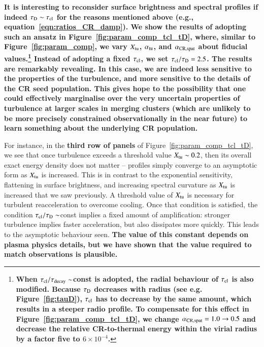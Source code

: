 \documentclass[fleqn,usenatbib,useAMS]{mnras}
\newcommand\C[1]{{\bf #1}}
\begin{document}
\C{It is
  interesting to reconsider surface brightness and spectral profiles if indeed
  $\tau_{\rm D} \sim \tau_{\rm cl}$ for the reasons mentioned above (e.g.,
  equation~\ref{eqn:ratios_CR_damp}). We show the results of adopting such an
  ansatz in Figure~\ref{fig:param_comp_tcl_tD}, where, similar to
  Figure~\ref{fig:param_comp}, we vary $X_{\rm tu}$, $\alpha_{\rm tu}$, and
  $\alpha_{\rm CR, spat}$ about fiducial values.\footnote{\C{When \C{$\tau_{\rm cl}/\tau_{\rm decay} \sim$const} is adopted, the radial behaviour of $\tau_{\rm cl}$ is
      also modified. Because $\tau_{\rm D}$ decreases with radius (see
      e.g. Figure~\ref{fig:tauD}), $\tau_{\rm cl}$ has to decrease by the same
      amount, which results in a steeper radio profile. To compensate for this
      effect in Figure~\ref{fig:param_comp_tcl_tD}, we change $\alpha_{\rm CR,
        spat}=1.0\rightarrow0.5$ and decrease the relative CR-to-thermal energy
      within the virial radius by a factor five to $6\times10^{-4}$.}} Instead
  of adopting a fixed $\tau_{\rm cl}$, we set $\tau_{\rm
    cl}/\tau_{\rm D} = 2.5 $. The results are remarkably revealing. In this case, we are indeed less
  sensitive to the properties of the turbulence, and more sensitive to the
  details of the CR seed population.  This gives hope to the possibility that
  one could effectively marginalise over the very uncertain properties of
  turbulence at larger scales in merging clusters (which are unlikely to be more
  precisely constrained observationally in the near future) to learn something
  about the underlying CR population.}

For instance, in the \C{third row of panels} of
Figure~\ref{fig:param_comp_tcl_tD}, we see that once turbulence exceeds a
threshold value $X_{\rm tu} \sim 0.2$, then its overall exact energy density
does not matter -- profiles simply converge to an asymptotic form as $X_{\rm
  tu}$ is increased. This is in contrast to the exponential sensitivity,
flattening in surface brightness, and increasing spectral curvature as $X_{\rm
  tu}$ is increased that we saw previously. A threshold value of $X_{\rm tu}$ is
necessary for turbulent reacceleration to overcome cooling. Once that condition
is satisfied, the condition $\tau_{\rm cl}/\tau_{\rm D} \sim$const implies a fixed
amount of amplification: stronger turbulence implies faster acceleration, but
also dissipates more quickly. This leads to the asymptotic behaviour seen. \C{The value of this constant depends on plasma physics details, but we have shown that the value required to match observations is plausible.}  
\end{document}
